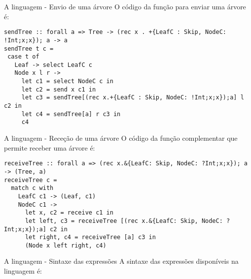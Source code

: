 \begin{frame}[fragile]{A linguagem - Envio de uma árvore}
  O código da função para enviar uma árvore é:
    \vskip 0.5cm
  \begin{lstlisting}
sendTree :: forall a => Tree -> (rec x . +{LeafC : Skip, NodeC: !Int;x;x}); a -> a
sendTree t c =
 case t of
   Leaf -> select LeafC c
   Node x l r ->
     let c1 = select NodeC c in
     let c2 = send x c1 in
     let c3 = sendTree[(rec x.+{LeafC : Skip, NodeC: !Int;x;x});a] l c2 in
     let c4 = sendTree[a] r c3 in
     c4

\end{lstlisting}
\end{frame}

\begin{frame}[fragile]{A linguagem - Receção de uma árvore}
  O código da função complementar que permite receber uma árvore é:
  \vskip 0.5cm
  \begin{lstlisting}
receiveTree :: forall a => (rec x.&{LeafC: Skip, NodeC: ?Int;x;x}); a -> (Tree, a)
receiveTree c =
  match c with
    LeafC c1 -> (Leaf, c1)
    NodeC c1 ->
      let x, c2 = receive c1 in
      let left, c3 = receiveTree [(rec x.&{LeafC: Skip, NodeC: ?Int;x;x});a] c2 in
      let right, c4 = receiveTree [a] c3 in
      (Node x left right, c4)
\end{lstlisting}
\end{frame}

\begin{frame}[fragile, shrink=20]{A linguagem - Sintaxe das expressões}
  \vskip 1cm
  A sintaxe das expressões disponíveis na linguagem é:
  
\end{frame}

